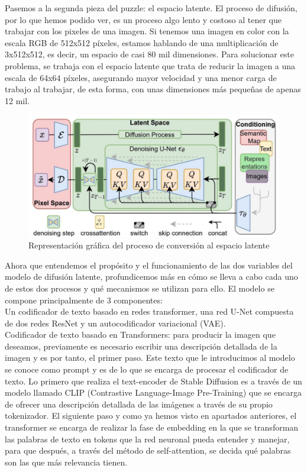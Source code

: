 Pasemos a la segunda pieza del puzzle: el espacio latente. El proceso de difusión, por lo que hemos podido ver, es un proceso algo lento y costoso al tener que trabajar con los pixeles de una imagen. Si tenemos una imagen en color con la escala RGB de 512x512 píxeles, estamos hablando de una multiplicación de 3x512x512, es decir, un espacio de casi 80 mil dimensiones. Para solucionar este problema, se trabaja con el espacio latente que trata de reducir la imagen a una escala de 64x64 píxeles, asegurando mayor velocidad y una menor carga de trabajo al trabajar, de esta forma, con unas dimensiones más pequeñas de apenas 12 mil. \\
\begin{figure}[h]
	\centering
	\includegraphics[width = 0.5
	\textwidth]{Imagenes/Vectorial/espaciolatente.png}
	\caption{Representación gráfica del proceso de conversión al espacio latente}
	\label{fig:sampleImage}
\end{figure}

Ahora que entendemos el propósito y el funcionamiento de las dos variables del modelo de difusión latente, profundicemos más en cómo se lleva a cabo cada uno de estos dos procesos y qué mecanismos se utilizan para ello. El modelo se compone principalmente de 3 componentes:\\

Un codificador de texto basado en redes transformer, una red U-Net compuesta de dos redes ResNet y un autocodificador variacional (VAE).\\

Codificador de texto basado en Transformers: para producir la imagen que deseamos, previamente es necesario escribir una descripción detallada de la imagen y es por tanto, el primer paso. Este texto que le introducimos al modelo se conoce como prompt y es de lo que se encarga de procesar el codificador de texto.  Lo primero que realiza el text-encoder de Stable Diffusion es a través de un modelo llamado CLIP (Contrastive Language-Image Pre-Training) que se encarga de ofrecer una descripción detallada de las imágenes a través de su propio tokenizador. El siguiente paso y como ya hemos visto en apartados anteriores, el transformer se encarga de realizar la fase de embedding en la que se transforman las palabras de texto en tokens que la red neuronal pueda entender y manejar, para que después, a través del método de self-attention, se decida qué palabras son las que más relevancia tienen.\\ 
 
